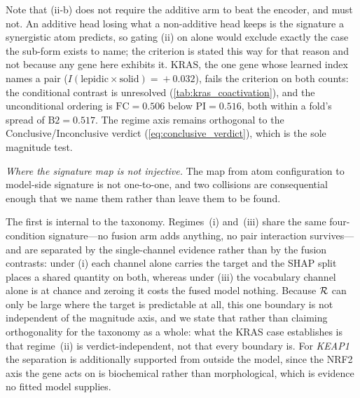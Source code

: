 Note that (ii-b) does not
require the additive arm to beat the encoder, and must not. An additive
head losing what a non-additive head keeps is the signature a
synergistic atom predicts, so gating (ii) on \piabmil{} alone would
exclude exactly the case the sub-form exists to name; the criterion is
stated this way for that reason and not because any gene here exhibits
it. KRAS, the one gene whose learned index names a pair
($I(\text{lepidic}\!\times\!\text{solid})\!=\!+0.032$), fails the
criterion on both counts: the conditional contrast is unresolved
(\cref{tab:kras_coactivation}), and the unconditional ordering is
$\mathrm{FC}\!=\!0.506$ below $\mathrm{PI}\!=\!0.516$, both within a
fold's spread of $\mathrm{B2}\!=\!0.517$. The regime axis remains
orthogonal to the Conclusive/Inconclusive verdict
(\cref{eq:conclusive_verdict}), which is the sole magnitude test.

\emph{Where the signature map is not injective.} The map from atom
configuration to model-side signature is not one-to-one, and two collisions
are consequential enough that we name them rather than leave them to be found.

The first is internal to the taxonomy. Regimes~(i) and~(iii) share the
same four-condition signature---no fusion arm adds anything, no pair
interaction survives---and are separated by the single-channel
evidence rather than by the fusion contrasts: under (i) each channel
alone carries the target and the SHAP split places a shared quantity on
both, whereas under (iii) the vocabulary channel alone is at chance and
zeroing it costs the fused model nothing. Because $\mathcal{R}$ can only be large where
the target is predictable at all, this one boundary is not independent of
the magnitude axis, and we state that rather than claiming orthogonality
for the taxonomy as a whole: what the KRAS case establishes is that
regime~(ii) is verdict-independent, not that every boundary is. For
\textit{KEAP1} the separation is additionally supported from outside the
model, since the NRF2 axis the gene acts on is biochemical rather than
morphological, which is evidence no fitted model supplies.

